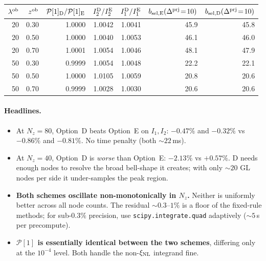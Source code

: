 \documentclass[11pt]{article}
\newcommand{\lob}{\lambda^{\rm ob}}
\newcommand{\zob}{z^{\rm ob}}
\newcommand{\dprj}{\Delta^{\rm prj}}
\newcommand{\xinl}{\xi_{\rm NL}}
\newcommand{\Pop}{\mathcal{P}}
\begin{document}
\vspace{4pt}
\begin{center}
\small
\begin{tabular}{r r r r r r r}
\toprule
\(\lob\) & \(\zob\) & \(\Pop[1]_{\rm D}/\Pop[1]_{\rm E}\)
         & \(I_2^{\rm D}/I_2^{\rm E}\) & \(I_1^{\rm D}/I_1^{\rm E}\)
         & \(b_{{\rm sel},{\rm E}}(\dprj\!=\!10)\)
         & \(b_{{\rm sel},{\rm D}}(\dprj\!=\!10)\) \\
\midrule
20 & 0.30 & 1.0000 & 1.0042 & 1.0041 & 45.9 & 45.8 \\
20 & 0.50 & 1.0000 & 1.0040 & 1.0053 & 46.1 & 46.0 \\
20 & 0.70 & 1.0001 & 1.0054 & 1.0046 & 48.1 & 47.9 \\
50 & 0.30 & 0.9999 & 1.0054 & 1.0048 & 22.2 & 22.1 \\
50 & 0.50 & 1.0000 & 1.0105 & 1.0059 & 20.8 & 20.6 \\
50 & 0.70 & 0.9999 & 1.0028 & 1.0030 & 20.6 & 20.6 \\
\bottomrule
\end{tabular}
\end{center}

\paragraph{Headlines.}
\begin{itemize}
  \item At \(N_z\!=\!80\), Option~D beats Option~E on \(I_1,I_2\):
        \(-0.47\%\) and \(-0.32\%\) vs \(-0.86\%\) and \(-0.81\%\).
        No time penalty (both \(\sim\!22\)\,ms).
  \item At \(N_z\!=\!40\), Option~D is \emph{worse} than Option~E:
        \(-2.13\%\) vs \(+0.57\%\). D needs enough nodes to resolve
        the broad bell-shape it creates; with only \(\sim\!20\) GL
        nodes per side it under-samples the peak region.
  \item \textbf{Both schemes oscillate non-monotonically in \(N_z\).}
        Neither is uniformly better across all node counts. The
        residual \(\sim\!0.3\)--\(1\%\) is a floor of the fixed-rule
        methods; for sub-\(0.3\%\) precision, use
        \texttt{scipy.integrate.quad} adaptively (\(\sim\!5\)\,s per
        precompute).
  \item \textbf{\(\Pop[1]\) is essentially identical between the two
        schemes}, differing only at the \(10^{-4}\) level. Both
        handle the non-\(\xinl\) integrand fine.
\end{itemize}
\end{document}
